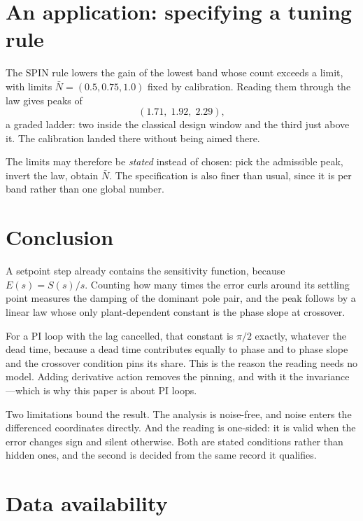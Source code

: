 \documentclass[final,3p,times,twocolumn]{elsarticle}
\newcommand{\spin}{SPIN\xspace}
\begin{document}
\section{An application: specifying a tuning rule}
\label{sec:spin}

The \spin rule \cite{SPIN} lowers the gain of the lowest band whose
count exceeds a limit, with limits $\bar N=(0.5,0.75,1.0)$ fixed by
calibration. Reading them through the law gives peaks of
\begin{equation}
(1.71,\;1.92,\;2.29),
\label{eq:spinlimits}
\end{equation}
a graded ladder: two inside the classical design window and the third
just above it. The calibration landed there without being aimed there.

The limits may therefore be \emph{stated} instead of chosen: pick the
admissible peak, invert the law, obtain $\bar N$. The specification is
also finer than usual, since it is per band rather than one global
number.

\section{Conclusion}

A setpoint step already contains the sensitivity function, because
$E(s)=S(s)/s$. Counting how many times the error curls around its
settling point measures the damping of the dominant pole pair, and the
peak follows by a linear law whose only plant-dependent constant is the
phase slope at crossover.

For a PI loop with the lag cancelled, that constant is $\pi/2$ exactly,
whatever the dead time, because a dead time contributes equally to phase
and to phase slope and the crossover condition pins its share. This is
the reason the reading needs no model. Adding derivative action removes
the pinning, and with it the invariance---which is why this paper is
about PI loops.

Two limitations bound the result. The analysis is noise-free, and noise
enters the differenced coordinates directly. And the reading is
one-sided: it is valid when the error changes sign and silent otherwise.
Both are stated conditions rather than hidden ones, and the second is
decided from the same record it qualifies.

\section*{Data availability}
\end{document}
